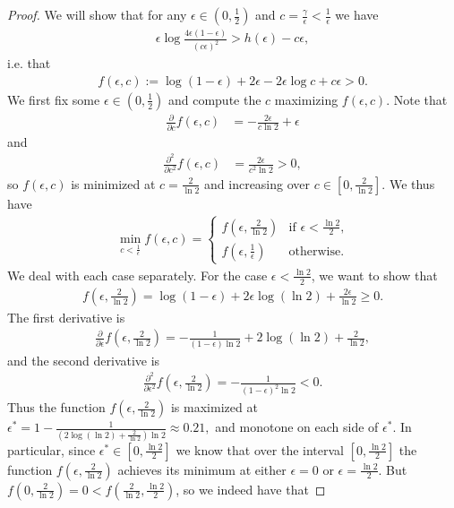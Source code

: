 \documentclass[12pt]{article}
\begin{document}
\begin{proof}
We will show that for any $\epsilon\in(0,\frac{1}{2})$ and $c=\frac{\gamma}{\epsilon}<\frac{1}{\epsilon}$ we have
\begin{align*}
    \epsilon \log\frac{4\epsilon(1-\epsilon)}{(c\epsilon)^{2}}>h(\epsilon)-c\epsilon,
\end{align*}
i.e. that
\begin{align}\label{goallistbnd}
    f(\epsilon,c):=\log(1-\epsilon)+2\epsilon-2\epsilon\log c +c\epsilon>0.
\end{align}
We first fix some $\epsilon\in(0,\frac{1}{2})$ and compute the $c$ maximizing $f(\epsilon,c)$. Note that
\begin{align*}
    \frac{\partial}{\partial c} f(\epsilon,c)&=-\frac{2\epsilon}{c\ln2} +\epsilon
\end{align*}
and 
\begin{align*}
    \frac{\partial^2}{\partial c^2} f(\epsilon,c)&=\frac{2\epsilon}{c^2\ln2}>0, 
\end{align*}
so $f(\epsilon,c)$ is minimized at $c=\frac{2}{\ln2}$ and increasing over $c\in[0,\frac{2}{\ln2}]$. We thus have
\begin{align}\label{2casesforc}
    \min_{c<\frac{1}{\epsilon}} f(\epsilon,c)=\begin{cases}
f(\epsilon,\frac{2}{\ln2}) & \text{if $\epsilon<\frac{\ln2}{2}$,}\\
f(\epsilon,\frac{1}{\epsilon}) & \text{otherwise.}
\end{cases}
\end{align}
We deal with each case separately. For the case $\epsilon<\frac{\ln2}{2}$, we want to show that
\begin{align*}
    f(\epsilon,\frac{2}{\ln2})=\log(1-\epsilon)+2\epsilon\log (\ln2) +\frac{2\epsilon}{\ln2}\geq 0.
\end{align*}
The first derivative is
\begin{align*}
    \frac{\partial}{\partial \epsilon}f(\epsilon,\frac{2}{\ln2})=-\frac{1}{(1-\epsilon)\ln2}+2\log(\ln2)+\frac{2}{\ln2},
\end{align*}
and the second derivative is
\begin{align*}
    \frac{\partial^2}{\partial \epsilon^2}f(\epsilon,\frac{2}{\ln2})=-\frac{1}{(1-\epsilon)^2\ln2}<0.
\end{align*}
Thus the function $f(\epsilon,\frac{2}{\ln2})$ is maximized at $\epsilon^*=1-\frac{1}{(2\log(\ln2)+\frac{2}{\ln2})\ln2}\approx 0.21,$ and monotone on each side of $\epsilon^*$. In particular, since $\epsilon^*\in[0,\frac{\ln2}{2}]$ we know that over the interval $[0,\frac{\ln2}{2}]$ the function $f(\epsilon,\frac{2}{\ln2})$ achieves its minimum at either $\epsilon=0$ or $\epsilon=\frac{\ln2}{2}$. But $f(0,\frac{2}{\ln2})=0<f(\frac{2}{\ln2},\frac{\ln2}{2})$, so we indeed have that

\end{proof}
\end{document}
